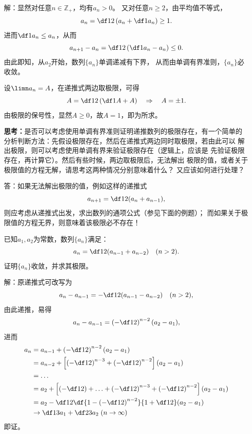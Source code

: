 解：显然对任意$n\in\mathbb{Z}_+$，均有$a_n>0$。
又对任意$n\geq2$，由平均值不等式，
$$a_n=\df 12\left(a_n+\df 1{a_n}\right)\geq 1.$$
进而$\df1{a_n}\leq a_n$，从而
$$a_{n+1}-a_n=\df12\left(\df1{a_n}-a_n\right)\leq0.$$
由此即知，从$a_2$开始，数列$\{a_n\}$单调递减有下界，
从而由单调有界准则，$\{a_n\}$必收敛。

设$\limn a_n=A$，在递推式两边取极限，可得
$$A=\df12\left(\df1A+A\right)\quad\Rightarrow\quad A=\pm1.$$
由极限的保号性，显然$A\geq0$，故$A=1$，即为所求。\fin

{\bf 思考：}是否可以考虑使用单调有界准则证明递推数列的极限存在，有一个简单的
分析判断方法：先假设极限存在，然后在递推式两边同时取极限，若由此可以
解出极限，则可以考虑使用单调有界来验证极限存在（逻辑上，应该是
先验证极限存在，再计算它）。然后有些时候，两边取极限后，无法解出
极限的值，或者关于极限值的方程无解，请思考这两种情况分别意味着什么？
又应该如何进行处理？

\ifhint
答：如果无法解出极限的值，例如这样的递推式
$$a_{n+1}=\df12(a_n+a_{n-1}),$$
则应考虑从递推式出发，求出数列的通项公式（参见下面的例题）；
而如果关于极限值的方程无界，则意味着该极限必不存在！
\fi

\bs
\egz 已知$a_1,a_2$为常数，数列$\{a_n\}$满足：
$$a_n=\df 12({a_{n-1}+a_{n-2}})\quad(n>2).$$
证明$\{a_n\}$收敛，并求其极限。

解：原递推式可改写为
$$a_n-a_{n-1}=-\df12(a_{n-1}-a_{n-2})\quad(n>2),$$
由此递推，易得
$$a_n-a_{n-1}=\left(-\df12\right)^{n-2}(a_2-a_1),$$
进而
\begin{align}
	a_n&=a_{n-1}+\left(-\df12\right)^{n-2}(a_2-a_1)\notag\\
	&=a_{n-2}+\left[\left(-\df12\right)^{n-3}+\left(-\df12\right)^{n-2}\right]
	(a_2-a_1)\notag\\
	&=\ldots\notag\\
	&=a_2+\left[\left(-\df12\right)+\ldots+\left(-\df12\right)^{n-3}
	+\left(-\df12\right)^{n-2}\right](a_2-a_1)\notag\\
	&=a_2-\df12\df{1-\left(-\df12\right)^{n-2}}{1+\df12}(a_2-a_1)\notag\\
	&\to\df13a_1+\df23a_2\;(n\to\infty)\notag
\end{align}
即证。\fin

